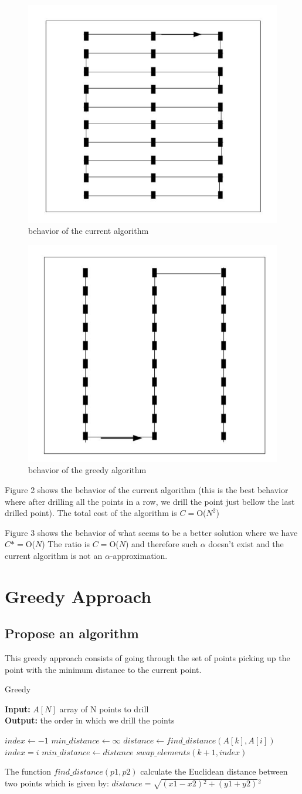 \documentclass{article}
\begin{document}
\begin{figure}[h]
\includegraphics[width=0.3\linewidth]{F1.jpg}
\caption{behavior of the current algorithm}
\end{figure}

\begin{figure}[h]
\includegraphics[width=0.3\linewidth]{F2.jpg}
\caption{behavior of the greedy algorithm}
\end{figure}

Figure 2 shows the behavior of the current algorithm (this is the best behavior where after drilling all the points in a row, we drill the point just bellow the last drilled point). The total cost of the algorithm is 
$C = $O($N^{2}$)

Figure 3 shows the behavior of what seems to be a better solution where we have $C* = $O($N$)
The ratio is $C = $O($N$) and therefore such $\alpha$ doesn't exist and the current algorithm is not an $\alpha$-approximation.

\section{Greedy Approach}
\subsection{Propose an algorithm}
This greedy approach consists of going through the set of points picking up the point with the minimum distance to the current point.

\begin{algorithm}[H]
\caption{Greedy}
\textbf{Input: }$A[N]$ array of N points to drill\\
\textbf{Output: }the order in which we drill the points
\begin{algorithmic} 
    \State $index \leftarrow -1$
    \State $min\_distance \leftarrow \infty $
        \State $distance \leftarrow find\_distance(A[k], A[i])$
            \State $index = i$ 
            \State $min\_distance \leftarrow distance$
        \EndIf
    \EndFor
    \State $swap\_elements(k+1, index)$
\EndFor

\end{algorithmic}
\end{algorithm}
The function $find\_distance(p1, p2)$ calculate the Euclidean distance between two points which is given by:
$distance = \sqrt{(x1-x2){^2} + (y1+y2)}{^2} $
\end{document}
